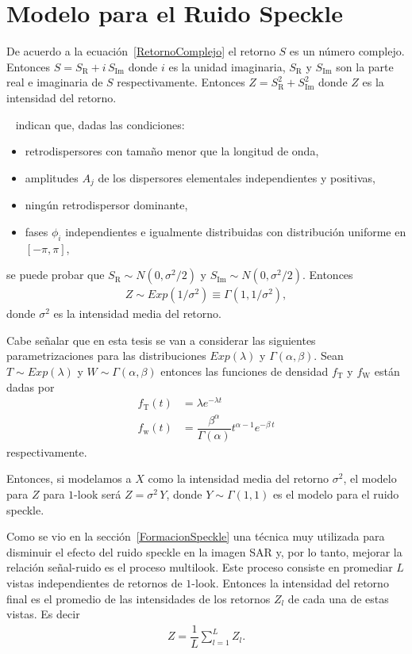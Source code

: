 \section{Modelo para el Ruido Speckle}
\label{ModeloSpeckle}

De acuerdo a la ecuación~\eqref{RetornoComplejo} el retorno $S$ es un número complejo. Entonces $S=S_{\text{R}}+i \, S_{\text{Im}}$ donde $i$ es la unidad imaginaria, $S_{\text{R}}$ y $S_{\text{Im}}$ son la parte real e imaginaria de $S$ respectivamente. Entonces $Z=S_{\text{R}}^2+S_{\text{Im}}^2$ donde $Z$ es la intensidad del retorno. 

~\citet{FreryLibro2019} indican que, dadas las condiciones:
\begin{itemize}
	\item retrodispersores con tamaño menor que la longitud de onda,
	\item amplitudes $A_j$ de los dispersores elementales independientes y positivas,
	\item ningún retrodispersor dominante, 
	\item fases $\phi_i$ independientes e igualmente distribuidas con distribución uniforme en $[-\pi,\pi]$,
\end{itemize}   
se puede probar que $S_{\text{R}} \sim N(0,\sigma^2/2)$ y $S_{\text{Im}} \sim N(0,\sigma^2/2)$. Entonces
\begin{align}
\label{DistRetornoExp}
	Z \sim Exp(1/\sigma^2) \equiv \Gamma(1,1/\sigma^2),
\end{align}
donde $\sigma^2$ es la intensidad media del retorno.

Cabe señalar que en esta tesis se van a considerar las siguientes parametrizaciones para las distribuciones $Exp(\lambda)$ y $\Gamma(\alpha,\beta)$. Sean $T \sim Exp(\lambda)$ y $W \sim \Gamma(\alpha,\beta)$ entonces las funciones de densidad $f_{\text{T}}$ y $f_{\text{W}}$ están dadas por
\begin{align}
f_{\text{T}}(t)&=\lambda e^{-\lambda t}\label{DistExponencial}\\
f_{\text{w}}(t)&=\dfrac{\beta^{\alpha}}{\Gamma(\alpha)} t^{\alpha-1} e^{-\beta \, t}\label{DistGamma}
\end{align}
respectivamente.  

Entonces, si modelamos a $X$ como la intensidad media del retorno $\sigma^2$, el modelo para $Z$ para $1$-look será $Z=\sigma^2 \, Y$, donde $Y \sim \Gamma(1,1)$ es el modelo para el ruido speckle.
 
Como se vio en la sección~\ref{FormacionSpeckle} una técnica muy utilizada para disminuir el efecto del ruido speckle en la imagen SAR y, por lo tanto, mejorar la relación señal-ruido es el proceso multilook. Este proceso consiste en promediar $L$ vistas independientes de retornos de $1$-look. Entonces la intensidad del retorno final es el promedio de las intensidades de los retornos $Z_l$ de cada una de estas vistas. Es decir 
\begin{align}
Z=\dfrac{1}{L}\sum_{l=1}^L Z_l.
\end{align}


